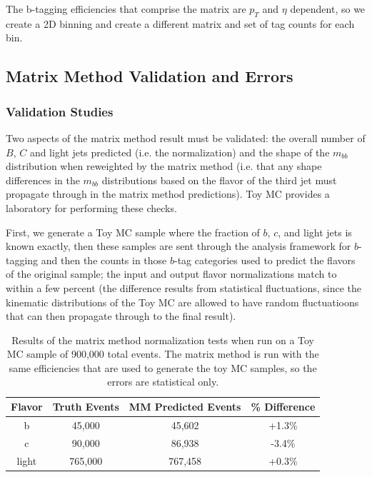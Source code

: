 The b-tagging efficiencies that comprise the matrix are $p_T$ and $\eta$ dependent, so we create a 2D binning and create a different matrix and set of tag counts for each bin.  



\subsection{Matrix Method Validation and Errors}
\subsubsection{Validation Studies}
Two aspects of the matrix method result must be validated: the overall number of $B$, $C$ and light jets predicted (i.e. the normalization) and the shape of the $m_{bb}$ distribution when reweighted by the matrix method (i.e. that any shape differences in the $m_{bb}$ distributions based on the flavor of the third jet must propagate through in the matrix method predictions).  Toy MC provides a laboratory for performing these checks.  

First, we generate a Toy MC sample where the fraction of $b$, $c$, and light 
jets is known exactly, then these samples are sent through the analysis framework for $b$-tagging and 
then the counts in those $b$-tag categories used to predict the flavors of the original sample; 
the input and output flavor normalizations match to within a few percent (the difference results from statistical fluctuations, 
since the kinematic distributions of the Toy MC are allowed to have random fluctuatioons that can then propagate through to the final result).  
\begin{table}
\centering
\caption{Results of the matrix method normalization tests when run on a Toy MC sample of 
    900,000 total events.  The matrix method is run with the same efficiencies that
    are used to generate the toy MC samples, so the errors are statistical only.
    \label{tab:mm_toy_mc}   }
  \begin{tabular}{cccc}
     \hline \hline
     Flavor & Truth Events & MM Predicted Events & \% Difference  \\ \hline
     b   & 45,000 & 45,602 & +1.3\% \\
     c   & 90,000 & 86,938 & -3.4\% \\
     light & 765,000 & 767,458 & +0.3\% \\
     \hline     \end{tabular}
\end{table}

